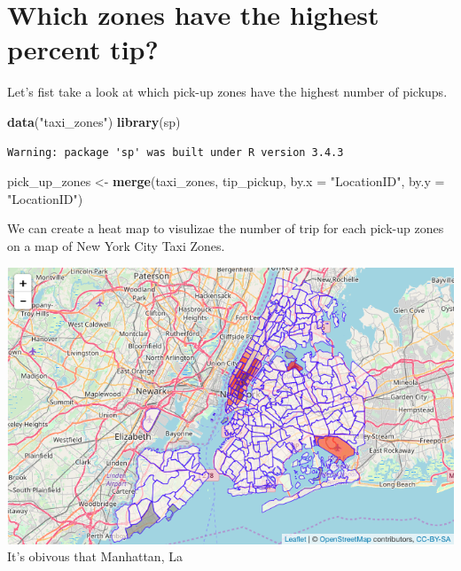 \documentclass[12pt,twoside]{reedthesis}
\newenvironment{Shaded}{\begin{snugshade}}{\end{snugshade}}
\newcommand{\KeywordTok}[1]{\textcolor[rgb]{0.13,0.29,0.53}{\textbf{#1}}}
\newcommand{\DataTypeTok}[1]{\textcolor[rgb]{0.13,0.29,0.53}{#1}}
\newcommand{\StringTok}[1]{\textcolor[rgb]{0.31,0.60,0.02}{#1}}
\newcommand{\CommentTok}[1]{\textcolor[rgb]{0.56,0.35,0.01}{\textit{#1}}}
\newcommand{\OtherTok}[1]{\textcolor[rgb]{0.56,0.35,0.01}{#1}}
\newcommand{\NormalTok}[1]{#1}
\theoremstyle{definition}
\theoremstyle{definition}
\theoremstyle{definition}
\theoremstyle{remark}
\begin{document}
\section{Which zones have the highest percent
tip?}\label{which-zones-have-the-highest-percent-tip}

Let's fist take a look at which pick-up zones have the highest number of
pickups.
\begin{Shaded}
\begin{Highlighting}[]
\KeywordTok{data}\NormalTok{(}\StringTok{"taxi_zones"}\NormalTok{)}
\KeywordTok{library}\NormalTok{(sp)}
\end{Highlighting}
\end{Shaded}
\begin{verbatim}
Warning: package 'sp' was built under R version 3.4.3
\end{verbatim}
\begin{Shaded}
\begin{Highlighting}[]
\NormalTok{pick_up_zones <-}\StringTok{ }\KeywordTok{merge}\NormalTok{(taxi_zones, tip_pickup, }\DataTypeTok{by.x =} \StringTok{"LocationID"}\NormalTok{, }
    \DataTypeTok{by.y =} \StringTok{"LocationID"}\NormalTok{)}
\end{Highlighting}
\end{Shaded}
We can create a heat map to visulizae the number of trip for each
pick-up zones on a map of New York City Taxi Zones.
\begin{Shaded}
\end{Shaded}
\includegraphics{figure/num_trip.png} It's obivous that Manhattan, La
\end{document}
